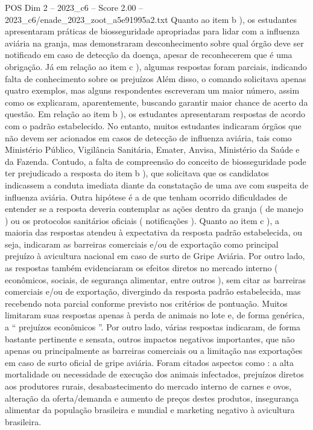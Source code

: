 \begin{textsample}{POS Dim 2 – 2023\_c6 – Score 2.00 – 2023\_c6/enade\_2023\_zoot\_a5e91995a2.txt}
Quanto ao item b ), os estudantes apresentaram práticas de biosseguridade apropriadas para lidar com a influenza aviária na granja, mas demonstraram desconhecimento sobre qual órgão deve ser notificado em caso de detecção da doença, apesar de reconhecerem que é uma obrigação.
Já em relação ao item c ), algumas respostas foram parciais, indicando falta de conhecimento sobre os prejuízos Além disso, o comando solicitava apenas quatro exemplos, mas alguns respondentes escreveram um maior número, assim como os explicaram, aparentemente, buscando garantir maior chance de acerto da questão.
Em relação ao item b ), os estudantes apresentaram respostas de acordo com o padrão estabelecido.
No entanto, muitos estudantes indicaram órgãos que não devem ser acionados em casos de detecção de influenza aviária, tais como Ministério Público, Vigilância Sanitária, Emater, Anvisa, Ministério da Saúde e da Fazenda.
Contudo, a falta de compreensão do conceito de biosseguridade pode ter prejudicado a resposta do item b ), que solicitava que os candidatos indicassem a conduta imediata diante da constatação de uma ave com suspeita de influenza aviária.
Outra hipótese é a de que tenham ocorrido dificuldades de entender se a resposta deveria contemplar as ações dentro da granja ( de manejo ) ou os protocolos sanitários oficiais ( notificações ).
Quanto ao item c ), a maioria das respostas atendeu à expectativa da resposta padrão estabelecida, ou seja, indicaram as barreiras comerciais e/ou de exportação como principal prejuízo à avicultura nacional em caso de surto de Gripe Aviária.
Por outro lado, as respostas também evidenciaram os efeitos diretos no mercado interno ( econômicos, sociais, de segurança alimentar, entre outros ), sem citar as barreiras comerciais e/ou de exportação, divergindo da resposta padrão estabelecida, mas recebendo nota parcial conforme previsto nos critérios de pontuação.
Muitos limitaram suas respostas apenas à perda de animais no lote e, de forma genérica, a “ prejuízos econômicos ”.
Por outro lado, várias respostas indicaram, de forma bastante pertinente e sensata, outros impactos negativos importantes, que não apenas ou principalmente as barreiras comerciais ou a limitação nas exportações em caso de surto oficial de gripe aviária.
Foram citados aspectos como : a alta mortalidade ou necessidade de execução dos animais infectados, prejuízos diretos aos produtores rurais, desabastecimento do mercado interno de carnes e ovos, alteração da oferta/demanda e aumento de preços destes produtos, insegurança alimentar da população brasileira e mundial e marketing negativo à avicultura brasileira.

\end{textsample}

